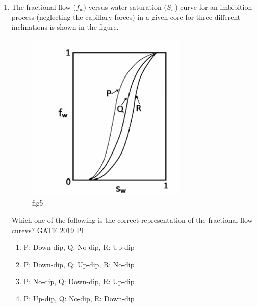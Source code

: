 \documentclass[journal,12pt,onecolumn]{IEEEtran}
\theoremstyle{remark}
\begin{document}
\begin{enumerate}
\begin{multicols}{2}
\begin{enumerate}
    \item P: low density oil -- water,\quad Q: gas -- water,\quad R: high density oil -- water
    \item P: gas -- water,\quad Q: low density oil -- water,\quad R: high density oil -- water
    \item P: high density oil -- water,\quad Q: low density oil -- water,\quad R: gas -- water
    \item P: gas -- water,\quad Q: high density oil -- water,\quad R: low density oil -- water
\end{enumerate}
\end{multicols}
\item The fractional flow ($f_w$) versus water saturation ($S_w$) curve for an imbibition process (neglecting the capillary forces) in a given core for three different inclinations is shown in the figure.
\begin{figure}[H]
    \centering
    \includegraphics[width=0.5\linewidth]{figs/Q.29.png}
    \caption{fig5}
    \label{fig:figs/Q.29.png}
\end{figure}
Which one of the following is the correct representation of the fractional flow curevs?
\hfill{GATE 2019 PI}

\begin{multicols}{2}
\begin{enumerate}
    \item P: Down-dip, \quad Q: No-dip, \quad R: Up-dip
    \item P: Down-dip, \quad Q: Up-dip, \quad R: No-dip
    \item P: No-dip, \quad Q: Down-dip, \quad R: Up-dip
    \item P: Up-dip, \quad Q: No-dip, \quad R: Down-dip
\end{enumerate}
\end{multicols}



\end{enumerate}
\end{document}
